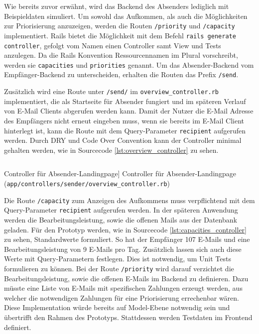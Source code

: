 Wie bereits zuvor erwähnt, wird das Backend des Absenders lediglich mit Beispieldaten simuliert. Um sowohl das Aufkommen, als auch die Möglichkeiten zur Priorisierung anzuzeigen, werden die Routen \texttt{/priority} und \texttt{/capacity} implementiert. Rails bietet die Möglichkeit mit dem Befehl \texttt{rails generate controller}, gefolgt vom Namen einen Controller samt View und Tests anzulegen. Da die Rails Konvention Ressourcennamen im Plural vorschreibt, werden sie \texttt{capacities} und \texttt{priorities} genannt. Um das Absender-Backend vom Empfänger-Backend zu unterscheiden, erhalten die Routen das Prefix \texttt{/send}. 

Zusätzlich wird eine Route unter \texttt{/send/} im \texttt{overview\_controller.rb} implementiert, die als Startseite für Absender fungiert und im späteren Verlauf von E-Mail Clients abgerufen werden kann. Damit der Nutzer die E-Mail Adresse des Empfängers nicht erneut eingeben muss, wenn sie bereits im E-Mail Client hinterlegt ist, kann die Route mit dem Query-Parameter \texttt{recipient} aufgerufen werden. Durch DRY und Code Over Convention kann der Controller minimal gehalten werden, wie in Sourcecode \ref{lst:overview_controller} zu sehen.

\begin{listing}[!ht]
\inputminted[linenos]{ruby}{Listings/Prototype/overview_controller.rb}

\caption
    [Controller für Absender-Landingpage]
    {Controller für Absender-Landingpage (\texttt{app/controllers/sender/overview\_controller.rb})}
    
\label{lst:overview_controller}
\end{listing}

\noindent Die Route \texttt{/capacity} zum Anzeigen des Aufkommens muss verpflichtend mit dem Query-Parameter \texttt{recipient} aufgerufen werden. In der späteren Anwendung werden die Bearbeitungsleistung, sowie die offenen Mails aus der Datenbank geladen. Für den Prototyp werden, wie in Sourcecode \ref{lst:capacities_controller} zu sehen, Standardwerte formuliert. So hat der Empfänger 107 E-Mails und eine Bearbeitungsleistung von 9 E-Mails pro Tag. Zusätzlich lassen sich auch diese Werte mit Query-Parametern festlegen. Dies ist notwendig, um Unit Tests formulieren zu können. Bei der Route \texttt{/priority} wird darauf verzichtet die Bearbeitungsleistung, sowie die offenen E-Mails im Backend zu definieren. Dazu müsste eine Liste von E-Mails mit spezifischen Zahlungen erzeugt werden, aus welcher die notwendigen Zahlungen für eine Priorisierung errechenbar wären. Diese Implementation würde bereits auf Model-Ebene notwendig sein und übertrifft den Rahmen des Prototyps. Stattdessen werden Testdaten im Frontend definiert.  

